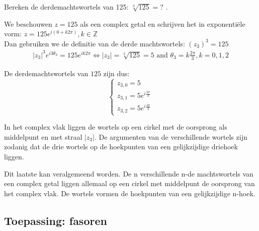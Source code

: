 \begin{voorbeeld}
	Bereken de derdemachtswortels van 125: $\sqrt[3]{125}=?$ .\\
	
	\vspace{0.5cm}
	
	We beschouwen $z=125$ als een complex getal en schrijven het in exponenti\"{e}le vorm: $z=125e^{i(0+k2\pi)}, k\in\mathbb{Z}$\\ Dan gebruiken we de definitie van de derde machtswortels: $(z_{3})^3 =125$ \\
	
	\[ \begin{array}{l} 
	|z_{3}|^3 e^{i3\theta_{3}} = 125e^{ik2\pi} 
	\iff |z_{3}|=\sqrt[3]{125}=5 \text{ and } \theta_{3}=k\frac{2\pi}{3}, k=0,1,2 
	\end{array} 
	\]
	
	De derdemachtswortels van $125$ zijn dus:\\
	
	\[  \left\{  \begin{array}{l}
	z_{3,0}=5 \\ z_{3,1}=5e^{i\frac{2\pi}{3}} \\ z_{3,2}=5e^{i\frac{4\pi}{3}} \end{array} \right.	
	\]
	



\begin{figure}[H]
	\centering 
	 
\end{figure}
	

	In het complex vlak liggen de wortels op een cirkel met de oorsprong als middelpunt en met straal $|z_{3}|$. De argumenten van de verschillende wortels zijn zodanig dat de drie wortels op de hoekpunten van een gelijkzijdige driehoek liggen.\\
	
\end{voorbeeld}

Dit laatste kan veralgemeend worden. De n verschillende n-de machtswortels van een complex getal liggen allemaal op een cirkel met middelpunt de oorsprong van het complex vlak. De wortels vormen de hoekpunten van een gelijkzijdige n-hoek.\\


\subsection{Toepassing: fasoren}

